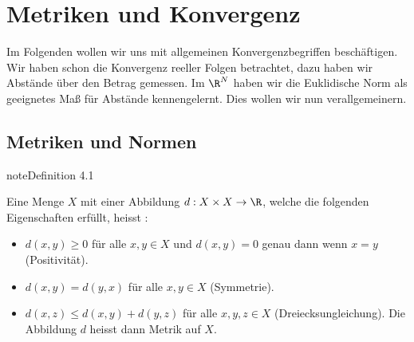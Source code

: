 \documentclass[letterpaper,10pt,english]{jupyterBook}
\begin{document}
\chapter{Metriken und Konvergenz}
\label{\detokenize{metrik/metrik:metriken-und-konvergenz}}\label{\detokenize{metrik/metrik::doc}}
Im Folgenden wollen wir uns mit allgemeinen Konvergenzbegriffen beschäftigen. Wir haben schon die Konvergenz reeller Folgen betrachtet, dazu haben wir Abstände über den Betrag gemessen. Im \(\R^N\) haben wir die Euklidische Norm als geeignetes Maß für Abstände kennengelernt. Dies wollen wir nun verallgemeinern.


\section{Metriken und Normen}
\label{\detokenize{metrik/normen:metriken-und-normen}}\label{\detokenize{metrik/normen::doc}}\label{metrik/normen:definition-0}
\begin{sphinxadmonition}{note}{Definition 4.1}



Eine Menge \(X\) mit einer Abbildung \(d: X \times X \rightarrow \R\), welche die folgenden Eigenschaften erfüllt, heisst :
\begin{itemize}
\item {} 
\(d(x,y) \geq 0\) für alle \(x,y \in X\) und \(d(x,y) = 0\) genau dann wenn \(x=y\) (Positivität).

\item {} 
\(d(x,y) = d(y,x)\) für alle \(x,y \in X\)  (Symmetrie).

\item {} 
\(d(x,z) \leq d(x,y) + d(y,z)\) für alle \(x,y,z \in X\)  (Dreiecksungleichung).
Die Abbildung \(d\) heisst dann Metrik auf \(X\).

\end{itemize}
\end{sphinxadmonition}
\end{document}
